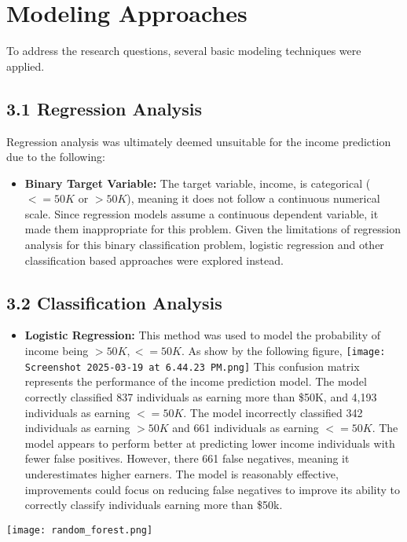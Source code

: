 \documentclass{article}
\begin{document}
\section{Modeling Approaches}
To address the research questions, several basic modeling techniques were applied.
\subsection{\textbf{3.1 Regression Analysis}}
Regression analysis was ultimately deemed unsuitable for the income prediction due to the following:
\begin{itemize}
    \item \textbf{Binary Target Variable:} The target variable, income, is categorical ($<=50K$ or $>50K$), meaning it does not follow a continuous numerical scale. Since regression models assume a continuous dependent variable, it made them inappropriate for this problem. 
Given the limitations of regression analysis for this binary classification problem, logistic regression and other classification based approaches were explored instead.
\end{itemize}

\subsection{\textbf{3.2 Classification Analysis}}

\begin{itemize}
    \item \textbf{Logistic Regression:} This method was used to model the probability of income being $>50K, <=50K.$ As show by the following figure, 
    \texttt{[image: Screenshot 2025-03-19 at 6.44.23 PM.png]}
    This confusion matrix represents the performance of the income prediction model. The model correctly classified 837 individuals as earning more than \$50K, and 4,193 individuals as earning $<=50K$. The model incorrectly classified 342 individuals as earning $>50K$ and 661 individuals as earning $<=50K$. The model appears to perform better at predicting lower income individuals with fewer false positives. However, there 661 false negatives, meaning it underestimates higher earners. The model is reasonably effective, improvements could focus on reducing false negatives to improve its ability to correctly classify individuals earning more than \$50k.
    
 \end{itemize}


\texttt{[image: random\_forest.png]}
\end{document}
